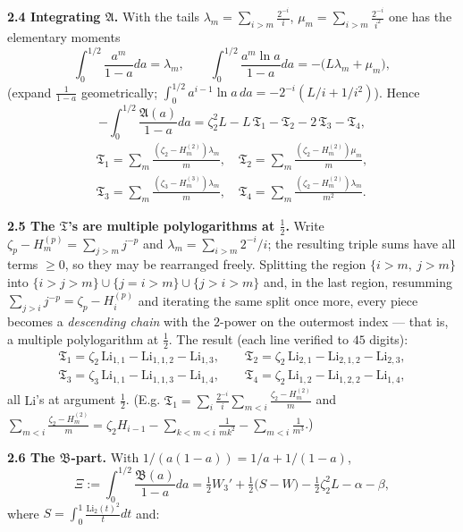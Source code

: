 \documentclass[11pt]{article}
\theoremstyle{remark}
\begin{document}
\textbf{2.4 Integrating $\mathfrak A$.} With the tails
$\lambda_m=\sum_{i>m}\frac{2^{-i}}{i}$, $\mu_m=\sum_{i>m}\frac{2^{-i}}{i^2}$ one has the elementary moments
\[
\int_0^{1/2}\frac{a^m}{1-a}da=\lambda_m,\qquad \int_0^{1/2}\frac{a^m\ln a}{1-a}da=-\big(L\lambda_m+\mu_m\big),
\]
(expand $\frac1{1-a}$ geometrically; $\int_0^{1/2}a^{i-1}\ln a\,da=-2^{-i}(L/i+1/i^2)$). Hence
\begin{equation*}
-\int_0^{1/2}\frac{\mathfrak A(a)}{1-a}da=\zeta_2^2L-L\,\mathfrak T_1-\mathfrak T_2-2\,\mathfrak T_3-\mathfrak T_4, \tag{2.4}
\end{equation*}
\[
\begin{gathered}
\mathfrak T_1=\sum_m\frac{(\zeta_2-H^{(2)}_m)\lambda_m}{m},\quad
\mathfrak T_2=\sum_m\frac{(\zeta_2-H^{(2)}_m)\mu_m}{m},\\
\mathfrak T_3=\sum_m\frac{(\zeta_3-H^{(3)}_m)\lambda_m}{m},\quad
\mathfrak T_4=\sum_m\frac{(\zeta_2-H^{(2)}_m)\lambda_m}{m^2}.
\end{gathered}
\]

\textbf{2.5 The $\mathfrak T$'s are multiple polylogarithms at $\tfrac12$.} Write $\zeta_p-H^{(p)}_m=\sum_{j>m}j^{-p}$ and $\lambda_m=\sum_{i>m}2^{-i}/i$; the resulting triple sums have all terms $\ge0$, so they may be rearranged freely. Splitting the region $\{i>m,\ j>m\}$ into $\{i>j>m\}\cup\{j=i>m\}\cup\{j>i>m\}$ and, in the last region, resumming $\sum_{j>i}j^{-p}=\zeta_p-H_i^{(p)}$ and iterating the same split once more, every piece becomes a \textit{descending chain} with the $2$-power on the outermost index --- that is, a multiple polylogarithm at $\tfrac12$. The result (each line verified to $45$ digits):
\begin{gather*}
\mathfrak T_1=\zeta_2\,\mathrm{Li}_{1,1}-\mathrm{Li}_{1,1,2}-\mathrm{Li}_{1,3},\qquad
\mathfrak T_2=\zeta_2\,\mathrm{Li}_{2,1}-\mathrm{Li}_{2,1,2}-\mathrm{Li}_{2,3},\\
\mathfrak T_3=\zeta_3\,\mathrm{Li}_{1,1}-\mathrm{Li}_{1,1,3}-\mathrm{Li}_{1,4},\qquad
\mathfrak T_4=\zeta_2\,\mathrm{Li}_{1,2}-\mathrm{Li}_{1,2,2}-\mathrm{Li}_{1,4}, \tag{2.5}
\end{gather*}
all $\mathrm{Li}$'s at argument $\tfrac12$. (E.g. $\mathfrak T_1=\sum_i\frac{2^{-i}}{i}\sum_{m<i}\frac{\zeta_2-H^{(2)}_m}{m}$ and
$\sum_{m<i}\frac{\zeta_2-H^{(2)}_m}{m}=\zeta_2H_{i-1}-\sum_{k<m<i}\frac1{mk^2}-\sum_{m<i}\frac1{m^3}$.)

\textbf{2.6 The $\mathfrak B$-part.} With $1/(a(1-a))=1/a+1/(1-a)$,
\begin{equation*}
\Xi:=\int_0^{1/2}\frac{\mathfrak B(a)}{1-a}da
=\tfrac12 W_3'+\tfrac12\big(S-W\big)-\tfrac12\zeta_2^2L-\alpha-\beta, \tag{2.6}
\end{equation*}
where $S=\int_0^1\frac{\mathrm{Li}_2(t)^2}{t}dt$ and:
\end{document}
